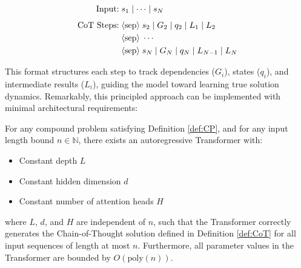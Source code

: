 \begin{definition}
  \vspace{0em}
    \small\begin{align*}
    \vspace{-0.5em}
        \text{Input:} & \; s_1 \mid \cdots \mid s_N \\[1ex]
        \text{CoT Steps:} & \; \langle\text{sep}\rangle \; s_2 \mid G_2 \mid q_2 \mid L_1 \mid L_2 \\
        & \; \langle\text{sep}\rangle \; \cdots \\
        & \; \langle\text{sep}\rangle \; s_{N} \mid G_N \mid q_N \mid L_{N-1} \mid L_N
    \end{align*}
    \label{def:CoT}
\end{definition}
\vspace{-\baselineskip}
This format structures each step to track dependencies ($G_i$), states ($q_i$), and intermediate results ($L_i$), guiding the model toward learning true solution dynamics. Remarkably, this principled approach can be implemented with minimal architectural requirements:

\begin{proposition}
\label{thm:CoT}
For any compound problem satisfying Definition \ref{def:CP}, and for any input length bound $n \in \mathbb{N}$, there exists an autoregressive Transformer with:
\begin{itemize}
\item Constant depth $L$
\item Constant hidden dimension $d$
\item Constant number of attention heads $H$
\end{itemize}
where $L$, $d$, and $H$ are independent of $n$, such that the Transformer correctly generates the Chain-of-Thought solution defined in Definition \ref{def:CoT} for all input sequences of length at most $n$. Furthermore, all parameter values in the Transformer are bounded by $O(\text{poly}(n))$.
\end{proposition}

